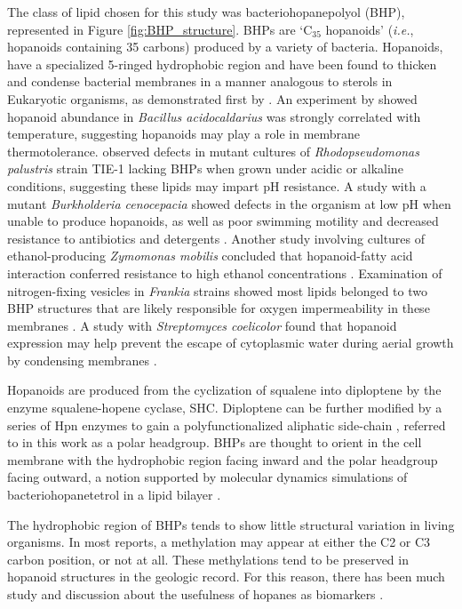 The class of lipid chosen for this study was bacteriohopanepolyol (BHP), represented in Figure \ref{fig:BHP_structure}. BHPs are `C$_{35}$ hopanoids' (\textit{i.e.}, hopanoids containing 35 carbons) produced by a variety of bacteria. Hopanoids, have a specialized 5-ringed hydrophobic region and have been found to thicken and condense bacterial membranes in a manner analogous to sterols in Eukaryotic organisms, as demonstrated first by \cite{poralla1980glycolipid}. An experiment by \cite{poralla1984effect} showed hopanoid abundance in \textit{Bacillus acidocaldarius} was strongly correlated with temperature, suggesting hopanoids may play a role in membrane thermotolerance. \cite{welander2009hopanoids} observed defects in mutant cultures of \textit{Rhodopseudomonas palustris} strain TIE-1 lacking BHPs when grown under acidic or alkaline conditions, suggesting these lipids may impart pH resistance. A study with a mutant \textit{Burkholderia cenocepacia} showed defects in the organism at low pH when unable to produce hopanoids, as well as poor swimming motility and decreased resistance to antibiotics and detergents \citep{schmerk2011hopanoid}. Another study involving cultures of ethanol-producing \textit{Zymomonas mobilis} concluded that hopanoid-fatty acid interaction conferred resistance to high ethanol concentrations \citep{bringer1985influence}. Examination of nitrogen-fixing vesicles in \textit{Frankia} strains showed most lipids belonged to two BHP structures that are likely responsible for oxygen impermeability in these membranes \citep{berry1993hopanoid}. A study with \textit{Streptomyces coelicolor} found that hopanoid expression may help prevent the escape of cytoplasmic water during aerial growth by condensing membranes \citep{poralla2000hopanoids}.

Hopanoids are produced from the cyclization of squalene into diploptene by the enzyme squalene-hopene cyclase, SHC. Diploptene can be further modified by a series of Hpn enzymes to gain a polyfunctionalized aliphatic side-chain \citep{belin2018hopanoid, welander2012identification}, referred to in this work as a polar headgroup. BHPs are thought to orient in the cell membrane with the hydrophobic region facing inward and the polar headgroup facing outward, a notion supported by molecular dynamics simulations of bacteriohopanetetrol in a lipid bilayer \citep{poger2013relative}.

The hydrophobic region of BHPs tends to show little structural variation in living organisms. In most reports, a methylation may appear at either the C2 or C3 carbon position, or not at all. These methylations tend to be preserved in hopanoid structures in the geologic record. For this reason, there has been much study and discussion about the usefulness of hopanes as biomarkers \citep[see review by][]{newman2016cellular}.

